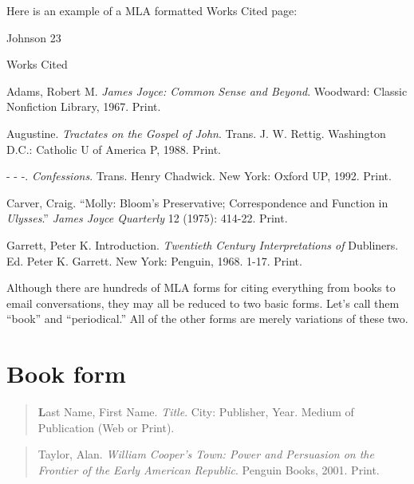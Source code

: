 Here is an example of a MLA formatted Works Cited page:

\newpage
\thispagestyle{empty}
\begin{flushright}Johnson 23\end{flushright}
\begin{center}
Works Cited
\end{center}
\begin{Spacing}{2}

Adams, Robert M. \emph{James Joyce: Common Sense and Beyond}. Woodward: Classic  Nonfiction Library, 1967. Print.

Augustine. \emph{Tractates on the Gospel of John}. Trans. J. W. Rettig. Washington D.C.:  Catholic U 
of America P, 1988. Print.

- - -. \emph{Confessions}. Trans. Henry Chadwick. New York: Oxford UP, 1992. Print.

Carver, Craig. ``Molly: Bloom's Preservative; Correspondence and Function in \emph{Ulysses}.'' \emph{James Joyce Quarterly} 12 (1975): 414-22. Print.

Garrett, Peter K. Introduction. \emph{Twentieth Century Interpretations of} Dubliners.  Ed. Peter K. Garrett. New York: Penguin, 1968. 1-17. Print.

\end{Spacing}

\newpage




										                



Although there are hundreds of MLA forms for citing everything from books to email conversations, they may all be reduced to two basic forms. Let's call them ``book'' and ``periodical.'' All of the other forms are merely variations of these two.

\section{Book form}


\begin{quote}
{\textbf Last Name, First Name. \emph{Title}. City: Publisher, Year. Medium  of Publication (Web or Print).}
\end{quote}

\medskip
\medskip

\begin{quote}
Taylor, Alan. \emph{William Cooper's Town: Power and Persuasion on the  Frontier of the Early American Republic}. Penguin Books, 2001.  Print.
\end{quote}

